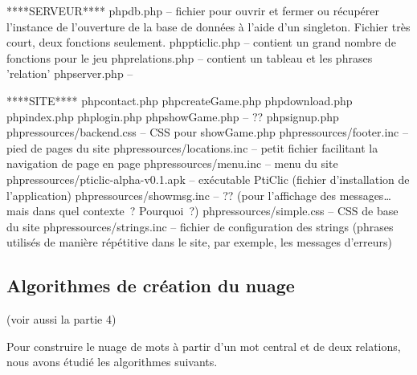 \documentclass[a4paper,11pt,french]{article}
\begin{document}
****SERVEUR****
php\/db.php -- fichier pour ouvrir et fermer ou récupérer l'instance de l'ouverture de la base de données à l'aide d'un singleton. 
		Fichier très court, deux fonctions seulement.
php\/pticlic.php -- contient un grand nombre de fonctions pour le jeu
php\/relations.php -- contient un tableau et les phrases 'relation'
php\/server.php --



****SITE****
php\/contact.php
php\/createGame.php
php\/download.php
php\/index.php
php\/login.php
php\/showGame.php -- ??
php\/signup.php
php\/ressources/backend.css  -- CSS pour showGame.php
php\/ressources/footer.inc  -- pied de pages du site
php\/ressources/locations.inc  -- petit fichier facilitant la navigation de page en page
php\/ressources/menu.inc  -- menu du site
php\/ressources/pticlic-alpha-v0.1.apk  -- exécutable PtiClic (fichier d'installation de l'application)
php\/ressources/showmsg.inc  -- ?? (pour l'affichage des messages… mais dans quel contexte~? Pourquoi~?)
php\/ressources/simple.css  -- CSS de base du site
php\/ressources/strings.inc -- fichier de configuration des strings (phrases utilisés de manière répétitive dans le site, par exemple, les messages d'erreurs)

\subsection{Algorithmes de création du nuage}

(voir aussi la partie 4)

Pour construire le nuage de mots à partir d'un mot central et de deux relations, nous avons étudié les algorithmes suivants.
\end{document}
